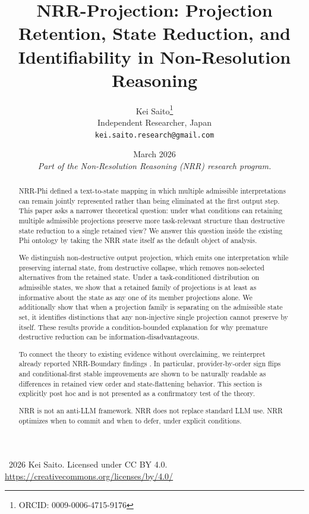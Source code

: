\documentclass[11pt,a4paper]{article}
\title{\textbf{NRR-Projection: Projection Retention, State Reduction, and Identifiability in Non-Resolution Reasoning}}
\author{
  Kei Saito\thanks{ORCID: 0009-0006-4715-9176} \\
  Independent Researcher, Japan \\
  \texttt{kei.saito.research@gmail.com}
}
\date{March 2026 \\[0.5em]
\textit{Part of the Non-Resolution Reasoning (NRR) research program.}}
\begin{document}
\maketitle

\begin{center}
\textcopyright\ 2026 Kei Saito.
Licensed under CC BY 4.0.\\
\url{https://creativecommons.org/licenses/by/4.0/}
\end{center}

\begin{abstract}
NRR-Phi \cite{saito2026phi} defined a text-to-state mapping in which multiple admissible interpretations can remain jointly represented rather than being eliminated at the first output step. This paper asks a narrower theoretical question: under what conditions can retaining multiple admissible projections preserve more task-relevant structure than destructive state reduction to a single retained view? We answer this question inside the existing Phi ontology by taking the NRR state itself as the default object of analysis.

We distinguish non-destructive output projection, which emits one interpretation while preserving internal state, from destructive collapse, which removes non-selected alternatives from the retained state. Under a task-conditioned distribution on admissible states, we show that a retained family of projections is at least as informative about the state as any one of its member projections alone. We additionally show that when a projection family is separating on the admissible state set, it identifies distinctions that any non-injective single projection cannot preserve by itself. These results provide a condition-bounded explanation for why premature destructive reduction can be information-disadvantageous.

To connect the theory to existing evidence without overclaiming, we reinterpret already reported NRR-Boundary findings \cite{saito2026boundary}. In particular, provider-by-order sign flips and conditional-first stable improvements are shown to be naturally readable as differences in retained view order and state-flattening behavior. This section is explicitly post hoc and is not presented as a confirmatory test of the theory.

NRR is not an anti-LLM framework. NRR does not replace standard LLM use. NRR optimizes when to commit and when to defer, under explicit conditions.
\end{abstract}
\end{document}
